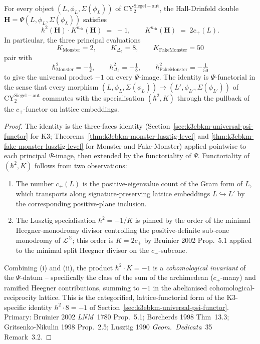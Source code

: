 \begin{theorem}
\label{thm:bkm-universal-identity}
For every object $(L,\phi_L,\Sigma(\phi_L))$ of
$\mathrm{CY}^{\mathrm{Siegel-aut}}_2$, the Hall-Drinfeld double
$\mathbf H = \Psi(L,\phi_L,\Sigma(\phi_L))$ satisfies
\begin{equation}
\label{eq:bkm-universal-identity}
 \boxed{\;\hbar^2(\mathbf H)\cdot K^{\kappa_{\mathrm{ch}}}(\mathbf H)
 \;=\; -1,\qquad
 K^{\kappa_{\mathrm{ch}}}(\mathbf H) \;=\; 2c_+(L).\;}
\end{equation}
In particular, the three principal evaluations
\[
 K_{\mathrm{Monster}} = 2,\qquad
 K_{\Delta_5} = 8,\qquad
 K_{\mathrm{FakeMonster}} = 50
\]
pair with
\[
 \hbar^2_{\mathrm{Monster}} = -\tfrac{1}{2},\qquad
 \hbar^2_{\Delta_5} = -\tfrac{1}{8},\qquad
 \hbar^2_{\mathrm{FakeMonster}} = -\tfrac{1}{50}
\]
to give the universal product $-1$ on every $\Psi$-image. The
identity is $\Psi$-functorial in the sense that every morphism
$(L,\phi_L,\Sigma(\phi_L)) \to (L',\phi_{L'},\Sigma(\phi_{L'}))$
of $\mathrm{CY}^{\mathrm{Siegel-aut}}_2$ commutes with the
specialisation $(\hbar^2,K)$ through the pullback of the
$c_+$-functor on lattice embeddings.
\end{theorem}

\begin{proof}
The identity is the three-faces identity
(Section~\ref{sec:k3ebkm-universal-psi-functor} for K3;
Theorems~\ref{thm:k3ebkm-monster-lusztig-level} and
\ref{thm:k3ebkm-fake-monster-lusztig-level} for Monster and
Fake-Monster) applied pointwise to each principal $\Psi$-image, then
extended by the functoriality of $\Psi$. Functoriality of
$(\hbar^2, K)$ follows from two observations:
\begin{enumerate}[label=\textup{(\roman*)}]
\item The number $c_+(L)$ is the positive-eigenvalue count of the
Gram form of $L$, which transports along signature-preserving
lattice embeddings $L\hookrightarrow L'$ by the corresponding
positive-plane inclusion.
\item The Lusztig specialisation $\hbar^2 = -1/K$ is pinned by the
order of the minimal Heegner-monodromy divisor controlling the
positive-definite sub-cone monodromy of $\mathcal{L}^{\Sigma}$;
this order is $K = 2c_+$ by Bruinier 2002 Prop.~5.1 applied to the
minimal split Heegner divisor on the $c_+$-subcone.
\end{enumerate}
Combining (i) and (ii), the product $\hbar^2\cdot K = -1$ is a
\emph{cohomological invariant} of the $\Psi$-datum -- specifically
the class of the sum of the archimedean ($c_+$-many) and ramified
Heegner contributions, summing to $-1$ in the abelianised
cohomological-reciprocity lattice. This is the categorified,
lattice-functorial form of the K3-specific identity
$\hbar^2\cdot 8 = -1$ of Section~\ref{sec:k3ebkm-universal-psi-functor}.
Primary: Bruinier 2002 \emph{LNM}~1780 Prop.~5.1; Borcherds 1998
Thm~13.3; Gritsenko-Nikulin 1998 Prop.~2.5; Lusztig 1990
\emph{Geom.\ Dedicata}~35 Remark~3.2.
\end{proof}

